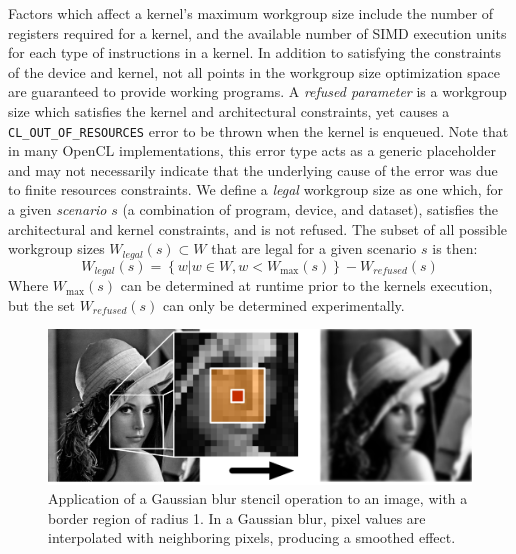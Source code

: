 \documentclass[nonatbib,preprint,nocopyrightspace,9pt]{sigplanconf}
\begin{document}
Factors which affect a kernel's maximum workgroup size include the
number of registers required for a kernel, and the available number of
SIMD execution units for each type of instructions in a kernel. In
addition to satisfying the constraints of the device and kernel, not
all points in the workgroup size optimization space are guaranteed to
provide working programs. A \emph{refused parameter} is a workgroup
size which satisfies the kernel and architectural constraints, yet
causes a \texttt{CL\_OUT\_OF\_RESOURCES} error to be thrown when the
kernel is enqueued. Note that in many OpenCL implementations, this
error type acts as a generic placeholder and may not necessarily
indicate that the underlying cause of the error was due to finite
resources constraints. We define a \emph{legal} workgroup size as one
which, for a given \emph{scenario} $s$ (a combination of program,
device, and dataset), satisfies the architectural and kernel
constraints, and is not refused. The subset of all possible workgroup
sizes $W_{legal}(s) \subset W$ that are legal for a given scenario $s$
is then:
%
\begin{equation}
  W_{legal}(s) = \left\{w | w \in W, w < W_{\max}(s) \right\} - W_{refused}(s)
\end{equation}
%
Where $W_{\max}(s)$ can be determined at runtime prior to the kernels
execution, but the set $W_{refused}(s)$ can only be determined
experimentally.


\begin{figure}
\centering
\includegraphics[width=.98\columnwidth]{img/lena-stencil.pdf}
\caption{%
  Application of a Gaussian blur stencil operation to an image, with a
  border region of radius 1. In a Gaussian blur, pixel values are
  interpolated with neighboring pixels, producing a smoothed effect.%
}
\label{fig:stencil-img}
\end{figure}
\end{document}
